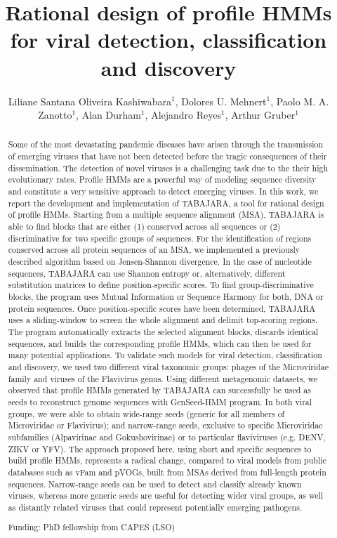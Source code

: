 \documentclass[twoside]{article}
\title{\vspace{-15mm}\fontsize{24pt}{10pt}\selectfont\textbf{Rational design of profile HMMs for viral detection, classification and discovery}} %
\author{Liliane Santana Oliveira Kashiwabara$^1$, Dolores U. Mehnert$^1$, Paolo M. A. Zanotto$^1$, Alan Durham$^1$, Alejandro Reyes$^1$, Arthur Gruber$^1$}
\affil{1 USP\\ }
\date{}
\begin{document}
\maketitle %

\thispagestyle{fancy} %


\begin{abstract}
Some of the most devastating pandemic diseases have arisen through the transmission of emerging viruses that have not been detected before the tragic consequences of their dissemination. The detection of novel viruses is a challenging task due to the their high evolutionary rates. Profile HMMs are a powerful way of modeling sequence diversity and constitute a very sensitive approach to detect emerging viruses. In this work, we report the development and implementation of TABAJARA, a tool for rational design of profile HMMs. Starting from a multiple sequence alignment (MSA), TABAJARA is able to find blocks that are either (1) conserved across all sequences or (2) discriminative for two specific groups of sequences. For the identification of regions conserved across all protein sequences of an MSA, we implemented a previously described algorithm based on Jensen-Shannon divergence. In the case of nucleotide sequences, TABAJARA can use Shannon entropy or, alternatively, different substitution matrices to define position-specific scores. To find group-discriminative blocks, the program uses Mutual Information or Sequence Harmony for both, DNA or protein sequences. Once position-specific scores have been determined, TABAJARA uses a sliding-window to screen the whole alignment and delimit top-scoring regions. The program automatically extracts the selected alignment blocks, discards identical sequences, and builds the corresponding profile HMMs, which can then be used for many potential applications. To validate such models for viral detection, classification and discovery, we used two different viral taxonomic groups: phages of the Microviridae family and viruses of the Flavivirus genus. Using different metagenomic datasets, we observed that profile HMMs generated by TABAJARA can successfully be used as seeds to reconstruct genome sequences with GenSeed-HMM program. In both viral groups, we were able to obtain wide-range seeds (generic for all members of Microviridae or Flavivirus); and narrow-range seeds, exclusive to specific Microviridae subfamilies (Alpavirinae and Gokushovirinae) or to particular flaviviruses (e.g. DENV, ZIKV or YFV). The approach proposed here, using short and specific sequences to build profile HMMs, represents a radical change, compared to viral models from public databases such as vFam and pVOGs, built from MSAs derived from full-length protein sequences. Narrow-range seeds can be used to detect and classify already known viruses, whereas more generic seeds are useful for detecting wider viral groups, as well as distantly related viruses that could represent potentially emerging pathogens.

Funding: PhD fellowship from CAPES (LSO)
\end{abstract}
\end{document}
